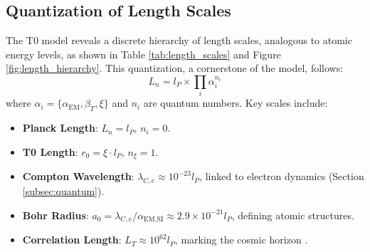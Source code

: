 \documentclass[12pt,a4paper]{article}
\begin{document}
	\subsection{Quantization of Length Scales}
	\label{subsec:quantization}
	
	The T0 model reveals a discrete hierarchy of length scales, analogous to atomic energy levels, as shown in Table \ref{tab:length_scales} and Figure \ref{fig:length_hierarchy}. This quantization, a cornerstone of the model, follows:
	\[
	L_n = l_P \times \prod_i \alpha_i^{n_i}
	\]
	where \(\alpha_i = \{\alpha_{\text{EM}}, \beta_T, \xi\}\) and \(n_i\) are quantum numbers. Key scales include:
	\begin{itemize}
		\item \textbf{Planck Length}: \(L_n = l_P\), \(n_i = 0\).
		\item \textbf{T0 Length}: \(r_0 = \xi \cdot l_P\), \(n_\xi = 1\).
		\item \textbf{Compton Wavelength}: \(\lambda_{C,e} \approx 10^{-23} l_P\), linked to electron dynamics (Section \ref{subsec:quantum}).
		\item \textbf{Bohr Radius}: \(a_0 = \lambda_{C,e} / \alpha_{\text{EM,SI}} \approx 2.9 \times 10^{-21} l_P\), defining atomic structures.
		\item \textbf{Correlation Length}: \(L_T \approx 10^{62} l_P\), marking the cosmic horizon \cite{pascher_planck_2025}.
	\end{itemize}
	
	\par %
	
\end{document}
